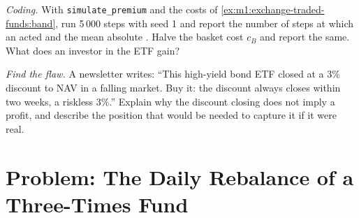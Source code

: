 \begin{exercise}[$\star\star\star$]\label{exo:m1:exchange-traded-funds:7}
\emph{Coding.} With \texttt{simulate\_premium} and the costs of
\cref{ex:m1:exchange-traded-funds:band}, run 5\,000 steps with seed 1 and
report the number of steps at which an  acted and the
mean absolute . Halve the basket cost $c_B$ and report the same. What
does an investor in the ETF gain?
\end{exercise}

\begin{exercise}[$\star\star\star$]\label{exo:m1:exchange-traded-funds:8}
\emph{Find the flaw.} A newsletter writes: ``This high-yield bond ETF closed
at a 3\% discount to NAV in a falling market. Buy it: the discount always
closes within two weeks, a riskless 3\%.'' Explain why the discount closing
does not imply a profit, and describe the position that would be needed to
capture it if it were real.
\end{exercise}

\section{Problem: The Daily Rebalance of a Three-Times Fund}

